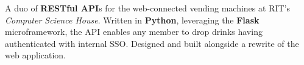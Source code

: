 \documentclass[margin,line]{resume}
\newcommand{\rurl}[1]{\hfill {\footnotesize \url{#1}}}
\begin{document}
\begin{resume}
\begin{asparablank}
        \small A duo of \textbf{RESTful API}s for the web-connected vending machines at RIT's 
        \textit{Computer Science House}. Written in \textbf{Python}, leveraging the \textbf{Flask} microframework, 
        the API enables any member to drop drinks having authenticated with internal SSO. Designed and built 
        alongside a rewrite of the web application.
        \\
	\end{asparablank}

% 


\end{resume}
\end{document}
